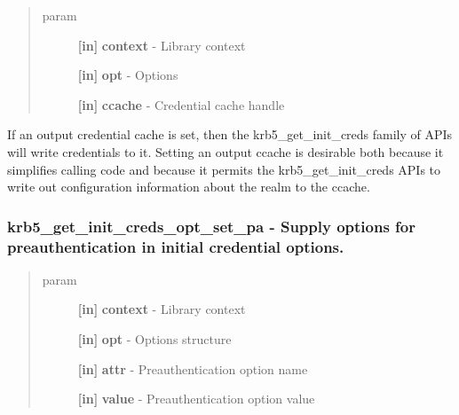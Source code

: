 \documentclass[letterpaper,10pt,english]{sphinxmanual}
\begin{document}
\begin{quote}\begin{description}
\item[{param}] \leavevmode
\textbf{{[}in{]}} \textbf{context} - Library context

\textbf{{[}in{]}} \textbf{opt} - Options

\textbf{{[}in{]}} \textbf{ccache} - Credential cache handle

\end{description}\end{quote}

If an output credential cache is set, then the krb5\_get\_init\_creds family of APIs will write credentials to it. Setting an output ccache is desirable both because it simplifies calling code and because it permits the krb5\_get\_init\_creds APIs to write out configuration information about the realm to the ccache.


\subsubsection{krb5\_get\_init\_creds\_opt\_set\_pa -  Supply options for preauthentication in initial credential options.}
\label{appdev/refs/api/krb5_get_init_creds_opt_set_pa::doc}\label{appdev/refs/api/krb5_get_init_creds_opt_set_pa:krb5-get-init-creds-opt-set-pa-supply-options-for-preauthentication-in-initial-credential-options}

\begin{fulllineitems}
\label{appdev/refs/api/krb5_get_init_creds_opt_set_pa:c.krb5_get_init_creds_opt_set_pa}
\end{fulllineitems}

\begin{quote}\begin{description}
\item[{param}] \leavevmode
\textbf{{[}in{]}} \textbf{context} - Library context

\textbf{{[}in{]}} \textbf{opt} - Options structure

\textbf{{[}in{]}} \textbf{attr} - Preauthentication option name

\textbf{{[}in{]}} \textbf{value} - Preauthentication option value

\end{description}\end{quote}
\end{document}
